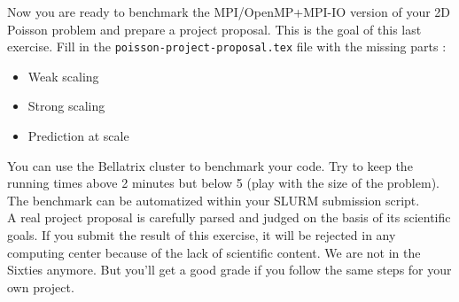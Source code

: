 \documentclass[11pt,a4paper]{article}
\begin{document}
\begin{exercise}
Now you are ready to benchmark the MPI/OpenMP+MPI-IO version of your 2D Poisson problem and prepare a project proposal. This is the goal of this last exercise. Fill in the \texttt{poisson-project-proposal.tex} file with the missing parts :

\begin{itemize}
	\item {Weak scaling}
	\item {Strong scaling}
	\item {Prediction at scale}
\end{itemize}

You can use the Bellatrix cluster to benchmark your code. Try to keep the running times above 2 minutes but below 5 (play with the size of the problem). The benchmark can be automatized within your SLURM submission script.
\\

\textcolor{dkred}{A real project proposal is carefully parsed and judged on the basis of its scientific goals. If you submit the result of this exercise, it will be rejected in any computing center because of the lack of scientific content. We are not in the Sixties anymore. But you'll get a good grade if you follow the same steps for your own project. }


\end{exercise}
\end{document}
